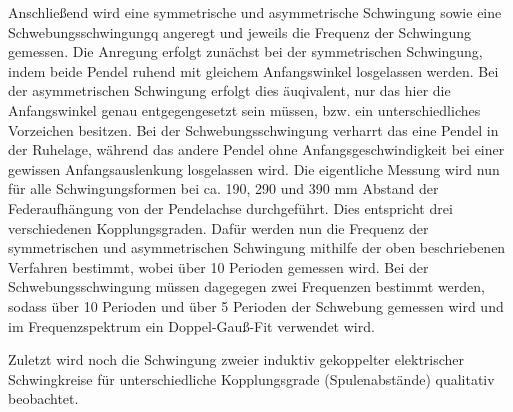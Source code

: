 \documentclass[12pt,a4paper,german]{scrartcl}
\numberwithin{equation}{section}
\begin{document}
  Anschließend wird eine symmetrische und asymmetrische Schwingung sowie eine Schwebungsschwingungq angeregt und jeweils die Frequenz der Schwingung gemessen.
  Die Anregung erfolgt zunächst bei der symmetrischen Schwingung, indem beide Pendel ruhend mit gleichem Anfangswinkel losgelassen werden.
  Bei der asymmetrischen Schwingung erfolgt dies äuqivalent, nur das hier die Anfangswinkel genau entgegengesetzt sein müssen, bzw. ein unterschiedliches Vorzeichen besitzen.
  Bei der Schwebungsschwingung verharrt das eine Pendel in der Ruhelage, während das andere Pendel ohne Anfangsgeschwindigkeit bei einer gewissen Anfangsauslenkung losgelassen wird.
  Die eigentliche Messung wird nun für alle Schwingungsformen bei ca. 190, 290 und 390 mm Abstand der Federaufhängung von der Pendelachse durchgeführt.
  Dies entspricht drei verschiedenen Kopplungsgraden.
  Dafür werden nun die Frequenz der symmetrischen und asymmetrischen Schwingung mithilfe der oben beschriebenen Verfahren bestimmt, wobei über 10 Perioden gemessen wird.
  Bei der Schwebungsschwingung müssen dagegegen zwei Frequenzen bestimmt werden, sodass über 10 Perioden und über 5 Perioden der Schwebung gemessen wird und im Frequenzspektrum ein Doppel-Gauß-Fit verwendet wird.

  Zuletzt wird noch die Schwingung zweier induktiv gekoppelter elektrischer Schwingkreise für unterschiedliche Kopplungsgrade (Spulenabstände) qualitativ beobachtet.
\end{document}
